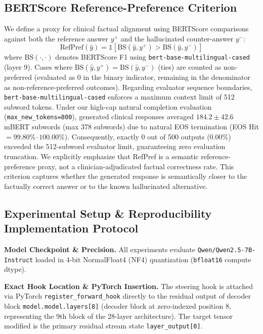 \documentclass[conference]{IEEEtran}
\begin{document}
\subsection{BERTScore Reference-Preference Criterion}
We define a proxy for clinical factual alignment using BERTScore \cite{ref16} comparisons against both the reference answer $y^+$ and the hallucinated counter-answer $y^-$:
\begin{equation}
\text{RefPref}(\hat{y}) = \mathbb{1}\left[\text{BS}(\hat{y}, y^+) > \text{BS}(\hat{y}, y^-)\right]
\end{equation}
where $\text{BS}(\cdot,\cdot)$ denotes BERTScore F1 using \texttt{bert-base-multilingual-cased} (layer 9). Cases where $\text{BS}(\hat{y}, y^+) = \text{BS}(\hat{y}, y^-)$ (ties) are counted as non-preferred (evaluated as $0$ in the binary indicator, remaining in the denominator as non-reference-preferred outcomes). Regarding evaluator sequence boundaries, \texttt{bert-base-multilingual-cased} enforces a maximum context limit of 512 subword tokens. Under our high-cap natural completion evaluation (\texttt{max\_new\_tokens=800}), generated clinical responses averaged $184.2 \pm 42.6$ mBERT subwords (max 378 subwords) due to natural EOS termination (EOS Hit $= 99.80\%$--$100.00\%$). Consequently, exactly 0 out of 500 outputs ($0.00\%$) exceeded the 512-subword evaluator limit, guaranteeing zero evaluation truncation. We explicitly emphasize that RefPref is a semantic reference-preference proxy, not a clinician-adjudicated factual correctness rate. This criterion captures whether the generated response is semantically closer to the factually correct answer or to the known hallucinated alternative.

\subsection{Experimental Setup \& Reproducibility Implementation Protocol}

\textbf{Model Checkpoint \& Precision.} All experiments evaluate \texttt{Qwen/Qwen2.5-7B-Instruct} \cite{ref4} loaded in 4-bit NormalFloat4 (NF4) quantization (\texttt{bfloat16} compute dtype).


\textbf{Exact Hook Location \& PyTorch Insertion.} The steering hook is attached via PyTorch \texttt{register\_forward\_hook} directly to the residual output of decoder block \texttt{model.model.layers[8]} (decoder block at zero-indexed position 8, representing the 9th block of the 28-layer architecture). The target tensor modified is the primary residual stream state \texttt{layer\_output[0]}.
\end{document}
